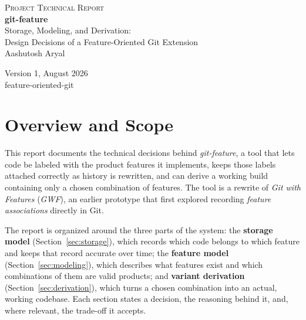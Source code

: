 \documentclass[11pt]{article}
\begin{document}
\begin{titlepage}
\centering
\vspace*{1.2cm}
{\sffamily\small\scshape\color{rulegray} Project Technical Report}\\[2.2cm]

{\Huge\bfseries git-feature}\\[0.6cm]
{\Large Storage, Modeling, and Derivation:\\[0.2cm] Design Decisions of a Feature-Oriented Git Extension}\\[2.2cm]

{\large Aashutosh Aryal}\\[0.4cm]

\vfill

{\large Version 1, August 2026}\\[0.3cm]
{\small\color{rulegray} feature-oriented-git}

\vspace*{1.5cm}
\end{titlepage}

\section{Overview and Scope}

This report documents the technical decisions behind \emph{git-feature}, a
tool that lets code be labeled with the product features it implements,
keeps those labels attached correctly as history is rewritten, and can
derive a working build containing only a chosen combination of features.
The tool is a rewrite of \emph{Git with Features} (\emph{GWF}), an earlier
prototype that first explored recording \emph{feature associations} directly in Git.


The report is organized around the three parts of the system: the
\textbf{storage model} (Section~\ref{sec:storage}), which records which code
belongs to which feature and keeps that record accurate over time; the
\textbf{feature model} (Section~\ref{sec:modeling}), which describes what
features exist and which combinations of them are valid products; and
\textbf{variant derivation} (Section~\ref{sec:derivation}), which turns a
chosen combination into an actual, working codebase. Each section states a
decision, the reasoning behind it, and, where relevant, the trade-off it
accepts.
\end{document}
